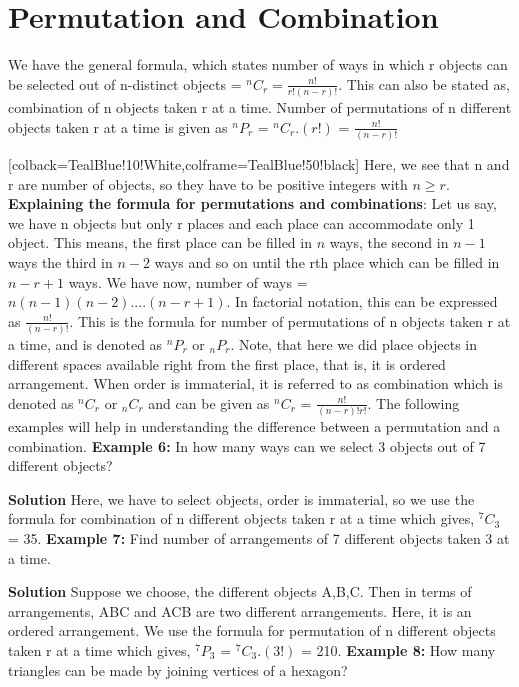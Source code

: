 \documentclass[12pt, a4paper]{article}
\begin{document}
\section {Permutation and Combination}
\begin{tcolorbox}[colback=TealBlue!10!White,colframe=TealBlue!50!black]
We have the general formula, which states number of ways in which r objects can be selected out of n-distinct objects = $^{n}C_{r} = \frac{n!}{r!(n-r)!}$. This can also be stated as, combination of n objects taken r at a time. \newline
Number of permutations of n different objects taken r at a time is given as $^nP_r$ = $^{n}C_{r}.(r!)$ = $\frac{n!}{(n-r)!}$
\end{tcolorbox}[colback=TealBlue!10!White,colframe=TealBlue!50!black] 
Here, we see that n and r are number of objects, so they have to be positive integers with $n \geq r$.\newline \newline
\textbf{Explaining the formula for permutations and combinations}:
Let us say, we have n objects but only r places and each place can accommodate only 1 object. This means, the first place can be filled in $n$ ways, the second in $n-1$ ways the third in $n-2$ ways and so on until the rth place which can be filled in $n-r+1$ ways. We have now, number of ways = $n(n-1)(n-2)....(n-r+1)$. In factorial notation, this can be expressed as $\frac{n!}{(n-r)!}$. This is the formula for number of permutations of n objects taken r at a time, and is denoted as $^nP_r$ or $_nP_r$. Note, that here we did place objects in different spaces available right from the first place, that is, it is ordered arrangement. When order is immaterial, it is referred to as combination which is denoted as $^nC_r$ or $_nC_r$ and can be given as $^nC_r$ = $\frac{n!}{(n-r)! r!}$. \newline The following examples will help in understanding the difference between a permutation and a combination.\newline
\textbf{Example 6:} In how many ways can we select 3 objects out of 7 different objects?

\textbf{Solution} Here, we have to select objects, order is immaterial, so we use the formula for combination of n different objects taken r at a time which gives, $^7C_3$ = 35.\newline
\textbf{Example 7:} Find number of arrangements of 7 different objects taken 3 at a time.

\textbf{Solution} Suppose we choose, the different objects A,B,C. Then in terms of arrangements, ABC and ACB are two different arrangements. Here, it is an ordered arrangement. We use the formula for permutation of n different objects taken r at a time which gives, $^7P_3$ = $^7C_3.(3!)$ = 210.\newline
\textbf{Example 8:} How many triangles can be made by joining vertices of a hexagon?
\end{document}
